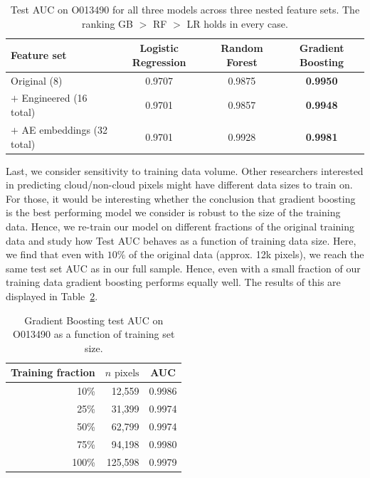 \documentclass[10pt,letterpaper]{article}
\begin{document}
\begin{table}[htbp]
\centering
\small
\caption{Test AUC on O013490 for all three models across three nested feature sets. The ranking GB $>$ RF $>$ LR holds in every case.}
\label{tab:stability_features}
\begin{tabular}{lccc}
\toprule
Feature set & Logistic Regression & Random Forest & Gradient Boosting \\
\midrule
Original (8)                  & 0.9707 & 0.9875 & \textbf{0.9950} \\
$+$ Engineered (16 total)     & 0.9701 & 0.9857 & \textbf{0.9948} \\
$+$ AE embeddings (32 total)  & 0.9701 & 0.9928 & \textbf{0.9981} \\
\bottomrule
\end{tabular}
\end{table}

Last, we consider sensitivity to training data volume. Other researchers interested in predicting cloud/non-cloud pixels might have different data sizes to train on. For those, it would be interesting whether the conclusion that gradient boosting is the best performing model we consider is robust to the size of the training data. Hence, we re-train our model on different fractions of the original training data and study how Test AUC behaves as a function of training data size. Here, we find that even with $10\%$ of the original data (approx. 12k pixels), we reach the same test set AUC as in our full sample. Hence, even with a small fraction of our training data gradient boosting performs equally well. The results of this are displayed in Table~\ref{tab:stability_lc}.

\begin{table}[htbp]
\centering
\small
\caption{Gradient Boosting test AUC on O013490 as a function of training set size.}
\label{tab:stability_lc}
\begin{tabular}{rrc}
\toprule
Training fraction & $n\text{ pixels}$ & AUC \\
\midrule
10\%  & 12{,}559  & 0.9986 \\
25\%  & 31{,}399  & 0.9974 \\
50\%  & 62{,}799  & 0.9974 \\
75\%  & 94{,}198  & 0.9980 \\
100\% & 125{,}598 & 0.9979 \\
\bottomrule
\end{tabular}
\end{table}
\end{document}
